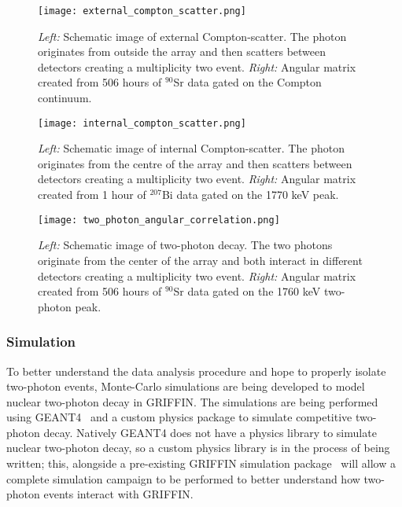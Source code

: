 \documentclass[cnatzke_thesis_proposal.tex]{subfiles}
\begin{document}
\begin{figure}[htbp]
  \centering
  \texttt{[image: external\_compton\_scatter.png]}
  \caption{
    \textit{Left:} Schematic image of external Compton-scatter. The photon originates from outside the array and then scatters between detectors creating a multiplicity two event.
    \textit{Right:} Angular matrix created from 506 hours of $^{90}$Sr data gated on the Compton continuum.
  }
  \label{fig:external_compton_scatter_schematic}
\end{figure}

\begin{figure}[htbp]
  \centering
  \texttt{[image: internal\_compton\_scatter.png]}
  \caption{
    \textit{Left:} Schematic image of internal Compton-scatter. The photon originates from the centre of the array and then scatters between detectors creating a multiplicity two event.
    \textit{Right:} Angular matrix created from 1 hour of $^{207}$Bi data gated on the 1770 keV peak.
  }
  \label{fig:internal_compton_scatter_schematic}
\end{figure}

\begin{figure}[htbp]
  \centering
  \texttt{[image: two\_photon\_angular\_correlation.png]}
  \caption{
    \textit{Left:} Schematic image of two-photon decay. The two photons originate from the center of the array and both interact in different detectors creating a multiplicity two event.
    \textit{Right:} Angular matrix created from 506 hours of $^{90}$Sr data gated on the 1760 keV two-photon peak.
  }
  \label{fig:two_photon_angular_schematic}
\end{figure}

\subsubsection{Simulation}
\label{sec:simulation}
To better understand the data analysis procedure and hope to properly isolate two-photon events, Monte-Carlo simulations are being developed to model nuclear two-photon decay in GRIFFIN.
The simulations are being performed using GEANT4~\cite{allison_recent_2016} and a custom physics package to simulate competitive two-photon decay.
Natively GEANT4 does not have a physics library to simulate nuclear two-photon decay, so a custom physics library is in the process of being written; this, alongside a pre-existing GRIFFIN simulation package~\cite{v_bildstein_griffincollaborationdetectorsimulations_v10_2017} will allow a complete simulation campaign to be performed to better understand how two-photon events interact with GRIFFIN.
\end{document}
